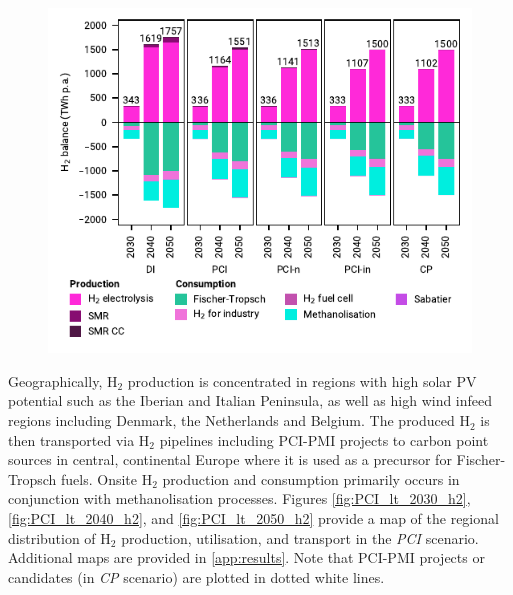 \documentclass[pdflatex,sn-nature]{sn-jnl}%
\theoremstyle{thmstyleone}%
\theoremstyle{thmstyletwo}%
\theoremstyle{thmstylethree}%
\begin{document}
\begin{figure}[htbp]
  \centering
  \includegraphics{figures/balances_overview_H2}
  \label{fig:balances_overview_H2}
\end{figure}

Geographically, H$_2$ production is concentrated in regions with high solar PV potential such as the Iberian and Italian Peninsula, as well as high wind infeed regions including Denmark, the Netherlands and Belgium. The produced H$_2$ is then transported via H$_2$ pipelines including PCI-PMI projects to carbon point sources  in central, continental Europe where it is used as a precursor for Fischer-Tropsch fuels. Onsite H$_2$ production and consumption primarily occurs in conjunction with methanolisation processes. Figures \ref{fig:PCI_lt_2030_h2}, \ref{fig:PCI_lt_2040_h2}, and \ref{fig:PCI_lt_2050_h2} provide a map of the regional distribution of H$_2$ production, utilisation, and transport in the \textit{PCI} scenario. Additional maps are provided in \ref{app:results}. Note that PCI-PMI projects or candidates (in \textit{CP} scenario) are plotted in dotted white lines.
\end{document}
